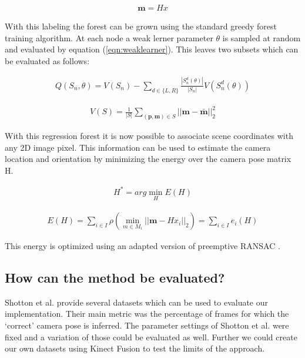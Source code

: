 \begin{eqnarray*}
  \mathbf{m} = Hx
\end{eqnarray*}

With this labeling the forest can be grown using the standard greedy forest training algorithm. At each node a weak lerner parameter $\theta$ is sampled at random and evaluated by equation (\ref{eqn:weaklearner}). This leaves two subsets which can be evaluated as follows:


\begin{eqnarray}
  Q(S_n,\theta) = V(S_n) - \sum_{d\in\{L,R\}}{\frac{|S_n^d(\theta)|}{|S_n|}V(S_n^d(\theta))}
\end{eqnarray}

\begin{eqnarray}
  V(S) = \frac{1}{|S|} \sum_{(\mathbf{p},\mathbf{m}) \in S}{||\mathbf{m} - \mathbf{\bar m}||_2^2}
\end{eqnarray}

With this regression forest it is now possible to associate scene coordinates with any 2D image pixel. This information can be used to estimate the camera location and orientation by minimizing the energy over the camera pose matrix H.

\begin{eqnarray}
  H^{*} = arg\min_H E(H)
\end{eqnarray} 

\begin{eqnarray}
  E(H) = \sum_{i \in \mathit{I}}{\rho (\min_{m \in \mathit{M}_i}||\mathbf{m} -Hx_i||_2)} = \sum_{i \in \mathit{I}}{e_i(H)}
\end{eqnarray}

This energy is optimized using an adapted version of preemptive RANSAC \cite{ransac}.



\subsection{How can the method be evaluated?} %
\label{sub:how_can_the_method_be_evaluated_}

Shotton et al. \cite{shotton} provide several datasets which can be used to evaluate our implementation. Their main metric was the percentage of frames for which the `correct' camera pose is inferred. The parameter settings of Shotton et al. were fixed and a variation of those could be evaluated as well. Further we could create our own datasets using Kinect Fusion \cite{izadi_fusion} \cite{newcombe_fusion} to test the limits of the approach.



